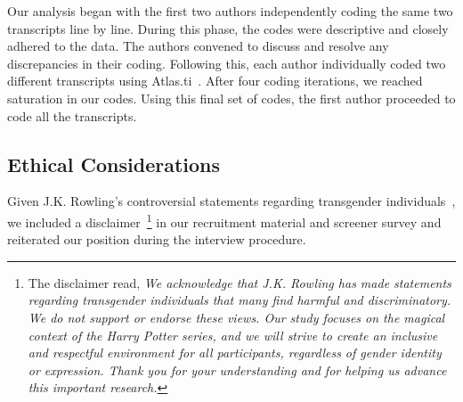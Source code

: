 Our analysis began with the first two authors independently coding the same two transcripts line by line. During this phase, the codes were descriptive and closely adhered to the data. The authors convened to discuss and resolve any discrepancies in their coding. Following this, each author individually coded two different transcripts using Atlas.ti~\cite{atlas}. After four coding iterations, we reached saturation in our codes. Using this final set of codes, the first author proceeded to code all the transcripts. 

\subsection{Ethical Considerations}
Given J.K. Rowling’s controversial statements regarding transgender individuals~\cite{Other-2020-JKIssues-x, Miller-2024-JKTransantagonism-a}, we included a disclaimer~\footnote{The disclaimer read, \textit{We acknowledge that J.K. Rowling has made statements regarding transgender individuals that many find harmful and discriminatory. We do not support or endorse these views. Our study focuses on the magical context of the Harry Potter series, and we will strive to create an inclusive and respectful environment for all participants, regardless of gender identity or expression. Thank you for your understanding and for helping us advance this important research.}} in our recruitment material and screener survey and reiterated our position during the interview procedure.
